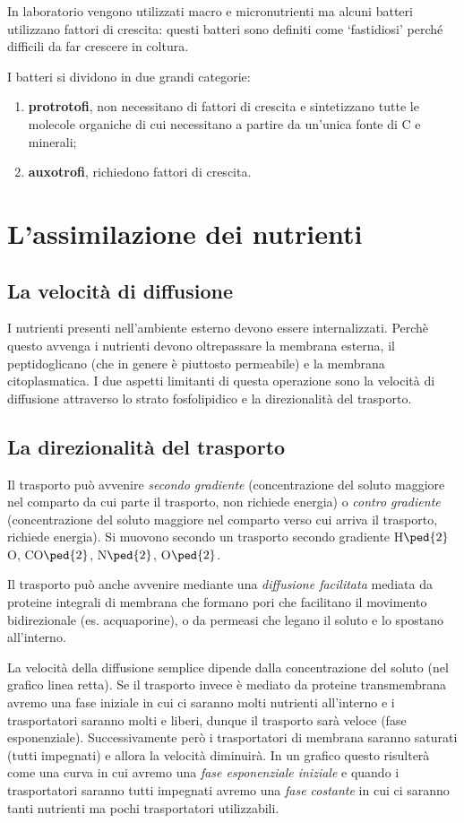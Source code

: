 \documentclass[11pt]{book}
\begin{document}
In laboratorio vengono utilizzati macro e micronutrienti ma alcuni batteri utilizzano fattori di crescita: questi batteri sono definiti come ‘fastidiosi’ perché difficili da far crescere in coltura.

I batteri si dividono in due grandi categorie:
\begin{enumerate}
\item \textbf{protrotofi}, non necessitano di fattori di crescita e sintetizzano tutte le molecole organiche di cui necessitano a partire da un’unica fonte di C e minerali;
\item \textbf{auxotrofi}, richiedono fattori di crescita.
\end{enumerate}

\section{L'assimilazione dei nutrienti}
\subsection{La velocità di diffusione}
I nutrienti presenti nell’ambiente esterno devono essere internalizzati. Perchè questo avvenga i nutrienti devono oltrepassare la membrana esterna, il peptidoglicano (che in genere è piuttosto permeabile) e la membrana citoplasmatica. I due aspetti limitanti di questa operazione sono la velocità di diffusione attraverso lo strato fosfolipidico e la direzionalità del trasporto.

\subsection{La direzionalità del trasporto}
Il trasporto può avvenire \emph{secondo gradiente} (concentrazione del soluto maggiore nel comparto da cui parte il trasporto, non richiede energia) o \emph{contro gradiente} (concentrazione del soluto maggiore nel comparto verso cui arriva il trasporto, richiede energia).
Si muovono secondo un trasporto secondo gradiente H$\ped{2}$O, CO$\ped{2}$, N$\ped{2}$, O$\ped{2}$.

Il trasporto può anche avvenire mediante una \emph{diffusione facilitata} mediata da proteine integrali di membrana che formano pori che facilitano il movimento bidirezionale (es. acquaporine), o da permeasi che legano il soluto e lo spostano all’interno.

La velocità della diffusione semplice dipende dalla concentrazione del soluto (nel grafico linea retta).
Se il trasporto invece è mediato da proteine transmembrana avremo una fase iniziale in cui ci saranno molti nutrienti all'interno e i trasportatori saranno molti e liberi, dunque il trasporto sarà veloce (fase esponenziale). Successivamente però i trasportatori di membrana saranno saturati (tutti impegnati) e allora la velocità diminuirà. In un grafico questo risulterà come una curva in cui avremo una \emph{fase esponenziale iniziale} e quando i trasportatori saranno tutti impegnati avremo una \emph{fase costante} in cui ci saranno tanti nutrienti ma pochi trasportatori utilizzabili.
\end{document}
